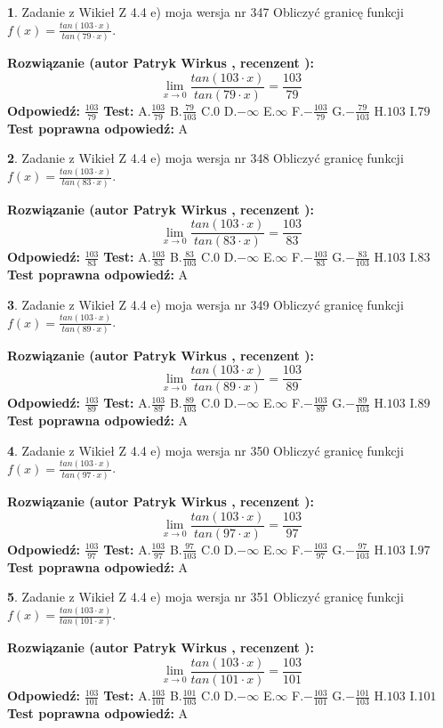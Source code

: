 \documentclass[12pt, a4paper]{article}
\theoremstyle{definition} %
\newtheorem{zad}{}
\newcommand{\zadStart}[1]{\begin{zad}#1\newline}
\newcommand{\zadStop}{\end{zad}}
\newcommand{\rozwStart}[2]{\noindent \textbf{Rozwiązanie (autor #1 , recenzent #2): }\newline}
\newcommand{\rozwStop}{\newline}
\newcommand{\odpStart}{\noindent \textbf{Odpowiedź:}\newline}
\newcommand{\odpStop}{\newline}
\newcommand{\testStart}{\noindent \textbf{Test:}\newline}
\newcommand{\testStop}{\newline}
\newcommand{\kluczStart}{\noindent \textbf{Test poprawna odpowiedź:}\newline}
\newcommand{\kluczStop}{\newline}
\begin{document}
\zadStart{Zadanie z Wikieł Z 4.4 e) moja wersja nr 347}
Obliczyć granicę funkcji $f(x)=\frac{tan(103\cdot x)}{tan(79\cdot x)}$.
\zadStop
\rozwStart{Patryk Wirkus}{}
$$\lim\limits_{x\to 0}\frac{tan(103\cdot x)}{tan(79\cdot x)}=
\frac{103}{79}$$
\rozwStop
\odpStart
$\frac{103}{79}$
\odpStop
\testStart
A.$\frac{103}{79}$
B.$\frac{79}{103}$
C.$0$
D.$-\infty$
E.$\infty$
F.$-\frac{103}{79}$
G.$-\frac{79}{103}$
H.$103$
I.$79$
\testStop
\kluczStart
A
\kluczStop



\zadStart{Zadanie z Wikieł Z 4.4 e) moja wersja nr 348}
Obliczyć granicę funkcji $f(x)=\frac{tan(103\cdot x)}{tan(83\cdot x)}$.
\zadStop
\rozwStart{Patryk Wirkus}{}
$$\lim\limits_{x\to 0}\frac{tan(103\cdot x)}{tan(83\cdot x)}=
\frac{103}{83}$$
\rozwStop
\odpStart
$\frac{103}{83}$
\odpStop
\testStart
A.$\frac{103}{83}$
B.$\frac{83}{103}$
C.$0$
D.$-\infty$
E.$\infty$
F.$-\frac{103}{83}$
G.$-\frac{83}{103}$
H.$103$
I.$83$
\testStop
\kluczStart
A
\kluczStop



\zadStart{Zadanie z Wikieł Z 4.4 e) moja wersja nr 349}
Obliczyć granicę funkcji $f(x)=\frac{tan(103\cdot x)}{tan(89\cdot x)}$.
\zadStop
\rozwStart{Patryk Wirkus}{}
$$\lim\limits_{x\to 0}\frac{tan(103\cdot x)}{tan(89\cdot x)}=
\frac{103}{89}$$
\rozwStop
\odpStart
$\frac{103}{89}$
\odpStop
\testStart
A.$\frac{103}{89}$
B.$\frac{89}{103}$
C.$0$
D.$-\infty$
E.$\infty$
F.$-\frac{103}{89}$
G.$-\frac{89}{103}$
H.$103$
I.$89$
\testStop
\kluczStart
A
\kluczStop



\zadStart{Zadanie z Wikieł Z 4.4 e) moja wersja nr 350}
Obliczyć granicę funkcji $f(x)=\frac{tan(103\cdot x)}{tan(97\cdot x)}$.
\zadStop
\rozwStart{Patryk Wirkus}{}
$$\lim\limits_{x\to 0}\frac{tan(103\cdot x)}{tan(97\cdot x)}=
\frac{103}{97}$$
\rozwStop
\odpStart
$\frac{103}{97}$
\odpStop
\testStart
A.$\frac{103}{97}$
B.$\frac{97}{103}$
C.$0$
D.$-\infty$
E.$\infty$
F.$-\frac{103}{97}$
G.$-\frac{97}{103}$
H.$103$
I.$97$
\testStop
\kluczStart
A
\kluczStop



\zadStart{Zadanie z Wikieł Z 4.4 e) moja wersja nr 351}
Obliczyć granicę funkcji $f(x)=\frac{tan(103\cdot x)}{tan(101\cdot x)}$.
\zadStop
\rozwStart{Patryk Wirkus}{}
$$\lim\limits_{x\to 0}\frac{tan(103\cdot x)}{tan(101\cdot x)}=
\frac{103}{101}$$
\rozwStop
\odpStart
$\frac{103}{101}$
\odpStop
\testStart
A.$\frac{103}{101}$
B.$\frac{101}{103}$
C.$0$
D.$-\infty$
E.$\infty$
F.$-\frac{103}{101}$
G.$-\frac{101}{103}$
H.$103$
I.$101$
\testStop
\kluczStart
A
\kluczStop
\end{document}
